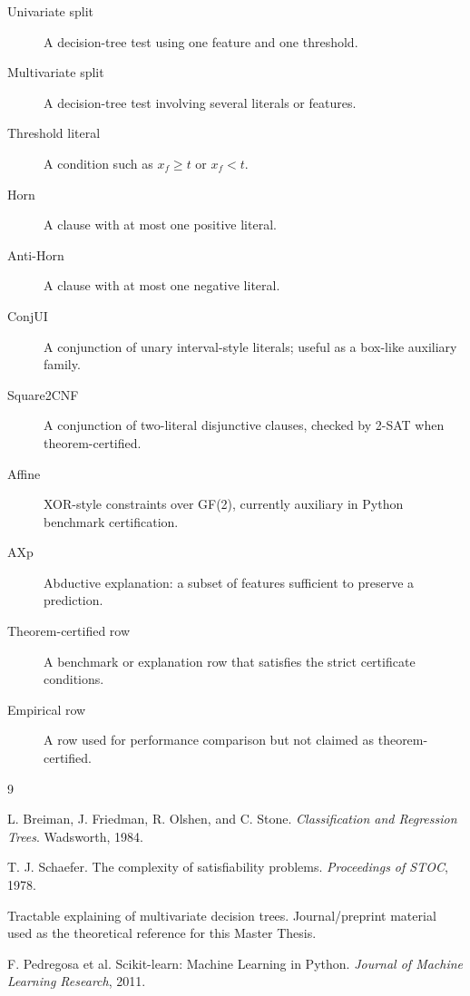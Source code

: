 \documentclass[11pt,a4paper]{article}
\begin{document}
\begin{description}
    \item[Univariate split] A decision-tree test using one feature and one threshold.
    \item[Multivariate split] A decision-tree test involving several literals or features.
    \item[Threshold literal] A condition such as $x_f \geq t$ or $x_f < t$.
    \item[Horn] A clause with at most one positive literal.
    \item[Anti-Horn] A clause with at most one negative literal.
    \item[ConjUI] A conjunction of unary interval-style literals; useful as a box-like auxiliary family.
    \item[Square2CNF] A conjunction of two-literal disjunctive clauses, checked by 2-SAT when theorem-certified.
    \item[Affine] XOR-style constraints over GF(2), currently auxiliary in Python benchmark certification.
    \item[AXp] Abductive explanation: a subset of features sufficient to preserve a prediction.
    \item[Theorem-certified row] A benchmark or explanation row that satisfies the strict certificate conditions.
    \item[Empirical row] A row used for performance comparison but not claimed as theorem-certified.
\end{description}

\begin{thebibliography}{9}

L. Breiman, J. Friedman, R. Olshen, and C. Stone.
\newblock \emph{Classification and Regression Trees}.
\newblock Wadsworth, 1984.

T. J. Schaefer.
\newblock The complexity of satisfiability problems.
\newblock \emph{Proceedings of STOC}, 1978.

Tractable explaining of multivariate decision trees.
\newblock Journal/preprint material used as the theoretical reference for this Master Thesis.

F. Pedregosa et al.
\newblock Scikit-learn: Machine Learning in Python.
\newblock \emph{Journal of Machine Learning Research}, 2011.

\end{thebibliography}
\end{document}
